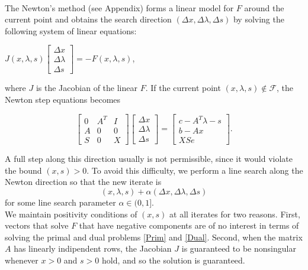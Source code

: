 \documentclass[a4paper,10 pt,titlepage,twoside]{book}
\theoremstyle{plain}
\theoremstyle{definition}
\theoremstyle{remark}
\begin{document}
\\
The Newton's method (see Appendix) forms a linear model for $\mathit{F}$ around the current point and obtains the search direction $(\Delta x,\Delta \lambda,\Delta s)$ by solving the following system of linear equations:
\begin{center}
	$\mathit{J}(x,\lambda,s)\begin{bmatrix}
	\Delta x\\\Delta\lambda \\\Delta s
	\end{bmatrix}=-\mathit{F}(x,\lambda,s)$,
\end{center}
where $\mathit{J}$ is the Jacobian of the linear $\mathit{F}$. If the current point $(x, \lambda, s)\notin\mathcal{F}$, the Newton step equations becomes

\begin{equation}\label{(5.1)}
	\begin{bmatrix}
0&A^{T}&I \\A&0&0\\S&0&X
	\end{bmatrix}\begin{bmatrix}
	\Delta x\\\Delta\lambda \\\Delta s
	\end{bmatrix}=\begin{bmatrix}
	c-A^{T}\lambda-s\\b-Ax\\XSe
	\end{bmatrix}.
\end{equation}

A full step along this direction usually is not permissible, since it would violate the bound $(x,s)>0$. To avoid this difficulty, we perform a line search along the Newton direction so that the new iterate is
\begin{equation*}
	(x,\lambda,s) +\alpha (\Delta x,\Delta \lambda,\Delta s)
\end{equation*} 
for some line search parameter $\alpha \in (0,1]$. \\We maintain positivity conditions of $(x,s)$ at all iterates for two reasons. First, vectors that solve $\mathit{F}$ that have negative components are of no interest in terms of solving the primal and dual problems \ref{Prim} and \ref{Dual}. Second, when the matrix $A$ has linearly indipendent rows, the Jacobian $J$ is guaranteed to be nonsingular whenever $x>0$ and $s>0$ hold, and so the solution is guaranteed.
\end{document}
